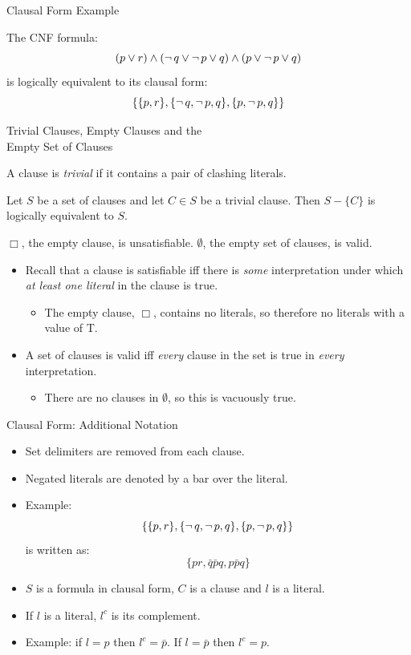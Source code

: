 \documentclass[style=sailor,size=12pt]{powerdot}
\begin{document}
\begin{wideslide}[bm=,toc=]{Clausal Form Example}
\begin{ex}{4.7}
The CNF formula:
\[ (p \lor r)\land (\mathop{\neg} q \lor \mathop{\neg} p \lor q) \land (p \lor \mathop{\neg} p \lor q) \] is
logically equivalent to its clausal form:
\[ \{\{p,r\},\{\mathop{\neg} q, \mathop{\neg} p, q\},\{p, \mathop{\neg} p, q\} \} \]
\end{ex}
\end{wideslide}

\begin{wideslide}[bm=,toc=]{Trivial Clauses, Empty Clauses and the\\ Empty Set of
  Clauses}
\begin{defn}{4.8}
A clause is \emph{trivial} if it contains a pair of clashing literals.
\end{defn}
\begin{lem}{4.9}
Let $S$ be a set of clauses and let $C \in S$ be a trivial clause. Then $S -
\{C\}$ is logically equivalent to $S$.
\end{lem}
\begin{lem}{4.10}
$\Box$, the empty clause, is unsatisfiable. $\emptyset$, the empty set of
clauses, is valid.
\end{lem}
\begin{itemize}
\item Recall that a clause is satisfiable iff there is \emph{some} interpretation
under which \emph{at least one literal} in the clause is true.
\begin{itemize}
\item The empty clause, $\Box$, contains no literals, so therefore no literals with a value of T.
\end{itemize}
\item A set of clauses is valid iff \emph{every} clause in the set is true in
\emph{every} interpretation.
\begin{itemize}
\item There are no clauses in $\emptyset$, so this is vacuously true.
\end{itemize}
\end{itemize}

\end{wideslide}

\begin{wideslide}[bm=,toc=]{Clausal Form: Additional Notation}
\begin{itemize}
\item Set delimiters are removed from each clause.
\item Negated literals are denoted by a bar over the literal.
\item Example: \[ \{\{p,r\},\{\mathop{\neg} q, \mathop{\neg} p, q\},\{p, \mathop{\neg} p, q\} \} \] is
written as:
\[\{pr, \bar{q}\bar{p}q, p\bar{p}q \}  \]
\item $S$ is a formula in clausal form, $C$ is a clause and $l$ is a literal.
\item If $l$ is a literal, $l^c$ is its complement.
\item Example: if $l = p$ then $l^c = \bar{p}$. If $l = \bar{p}$ then $l^c = p$.
\end{itemize}
\end{wideslide}
\end{document}
